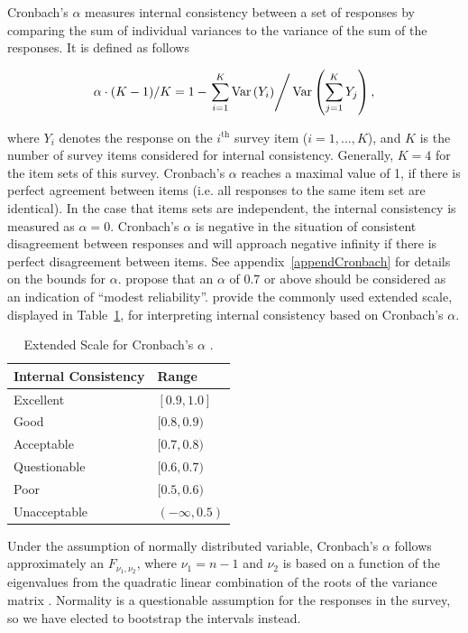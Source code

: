\documentclass{article}\usepackage[]{graphicx}\usepackage[]{color}
\newcommand{\V}[1]{\text{Var}\left(#1\right)}
\begin{document}
Cronbach's $\alpha$ measures internal consistency between a set of responses by comparing the sum of individual variances to the variance of the sum of the responses. It is defined as follows

\begin{equation} \label{eq:alpha}
\alpha \cdot (K-1)/K =  1- \left . \sum_{i=1}^K \V{Y_i} \right /  \V{\sum_{j=1}^K Y_j},
\end{equation}

where $Y_i$ denotes the response on the $i^{\text{th}}$ survey item ($ i = 1,... , K$), and $K$ is the number of survey items considered for internal consistency. Generally, $K=4$ for the item sets of this survey.
Cronbach's $\alpha$ reaches a maximal value of 1, if there is perfect agreement between items (i.e. all responses to the same item set are identical). In the case that items sets are independent, the internal consistency is measured as $\alpha = 0 $. Cronbach's $\alpha$ is negative in the situation of consistent disagreement between responses and will approach negative infinity if there is perfect disagreement between items.  See appendix~\ref{appendCronbach} for details on the bounds for $\alpha$. 
 \citet[][p.~265]{Nunnally1978} propose that an $\alpha$ of 0.7 or above should be considered as an indication of ``modest reliability''.   \citet{GeorgeMallery2003} provide the commonly used extended scale, displayed in Table~\ref{GMAlphaScale}, for interpreting internal consistency based on Cronbach's $\alpha$. \\

\begin{table}[H]
\centering
\begin{tabular}{ll}
\hline 
Internal Consistency & Range \\
\hline
Excellent &  $[ 0.9 , 1.0 ]$ \\
Good & $[ 0.8 , 0.9 )$ \\
Acceptable & $[ 0.7 , 0.8 ) $\\
Questionable & $[ 0.6 , 0.7 )$ \\
Poor & $[ 0.5 , 0.6 )$ \\
Unacceptable & $( -\infty, 0.5 )$ \\
\hline
\end{tabular}
\caption{Extended Scale for Cronbach's $\alpha$ \citep{GeorgeMallery2003}.} 
\label{GMAlphaScale}
\end{table}

Under the assumption of normally distributed variable, Cronbach's $\alpha$ follows approximately an $F_{\nu_1,\nu_2}$, where $\nu_1 = n-1$ and $\nu_2$ is based on a function of the eigenvalues from the quadratic linear combination of the roots of the variance matrix \citep{KistnerMuller2004}.  %
Normality is a questionable assumption for the responses in the survey, so we have elected to bootstrap the intervals instead.
\end{document}
